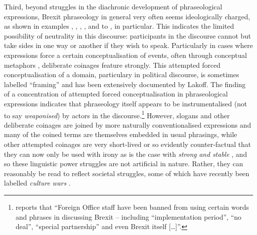 \documentclass[output=paper]{langscibook}
\begin{document}
Third, beyond struggles in the diachronic development of phraseological expressions, Brexit phraseology in general very often seems ideologically charged, as shown in examples , , , ,  and  to , in particular. This indicates the limited possibility of neutrality in this discourse: participants in the discourse cannot but take sides in one way or another if they wish to speak. Particularly in cases where expressions force a certain conceptualisation of events, often through conceptual metaphors \citep{LakoffJohnson1980}, deliberate coinages feature strongly. This attempted forced conceptualisation of a domain, particulary in political discourse, is sometimes labelled ``framing'' \citep{Lakoff2010} and has been extensively documented by Lakoff. The finding of a concentration of attempted forced conceptualisation in phraseological expressions indicates that phraseology itself appears to be instrumentalised (not to say \textit{weaponised}) by actors in the discourse.\footnote{\citet{Wintour2020} reports that ``Foreign Office staff have been banned from using certain words and phrases in discussing Brexit -- including “implementation period”, “no deal”, “special partnership” and even Brexit itself […]''.} However, slogans and other deliberate coinages are joined by more naturally conventionalised expressions and many of the coined terms are themselves embedded in usual phrasings, while other attempted coinages are very short-lived or so evidently counter-factual that they can now only be used with irony as is the case with \textit{strong and stable} , and so these linguistic power struggles are not artificial in nature. Rather, they can reasonably be read to reflect societal struggles, some of which have recently been labelled \textit{culture wars} \citep{SobolewskaFord2020}.
\end{document}
